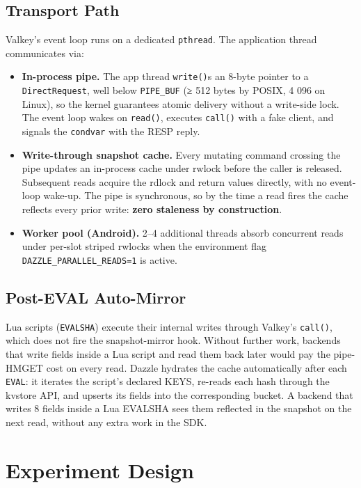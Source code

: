 \subsection{Transport Path}\label{transport-path}

Valkey's event loop runs on a dedicated \texttt{pthread}. The application thread
communicates via:

\begin{itemize}
\tightlist
\item
  \textbf{In-process pipe.} The app thread \texttt{write()}s an 8-byte pointer
  to a \texttt{DirectRequest}, well below \texttt{PIPE\_BUF} (≥ 512 bytes by
  POSIX, 4 096 on Linux), so the kernel guarantees atomic delivery without a
  write-side lock. The event loop wakes on \texttt{read()}, executes
  \texttt{call()} with a fake client, and signals the \texttt{condvar} with the
  RESP reply.
\item
  \textbf{Write-through snapshot cache.} Every mutating command crossing the
  pipe updates an in-process cache under rwlock before the caller is released.
  Subsequent reads acquire the rdlock and return values directly, with no
  event-loop wake-up. The pipe is synchronous, so by the time a read fires the
  cache reflects every prior write: \textbf{zero staleness by construction}.
\item
  \textbf{Worker pool (Android).} 2--4 additional threads absorb concurrent
  reads under per-slot striped rwlocks when the environment flag
  \texttt{DAZZLE\_PARALLEL\_READS=1} is active.
\end{itemize}

\subsection{Post-EVAL Auto-Mirror}\label{post-eval-auto-mirror}

Lua scripts (\texttt{EVALSHA}) execute their internal writes through Valkey's
\texttt{call()}, which does not fire the snapshot-mirror hook. Without further
work, backends that write fields inside a Lua script and read them back later
would pay the pipe-HMGET cost on every read. Dazzle hydrates the cache
automatically after each \texttt{EVAL}: it iterates the script's declared KEYS,
re-reads each hash through the kvstore API, and upserts its fields into the
corresponding bucket. A backend that writes 8 fields inside a Lua EVALSHA sees
them reflected in the snapshot on the next read, without any extra work in the
SDK.

\section{Experiment Design}\label{experiment-design}

